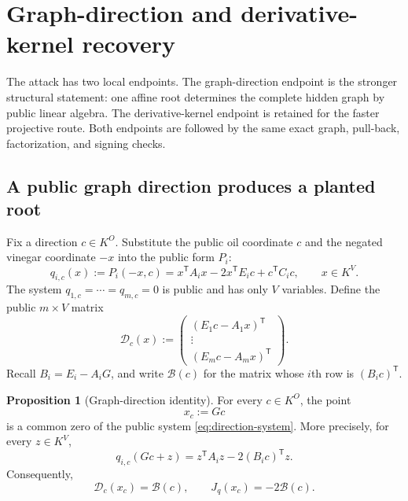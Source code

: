 \documentclass[11pt,a4paper]{article}
\theoremstyle{definition}
\newtheorem{proposition}[theorem]{Proposition}
\theoremstyle{remark}
\begin{document}
\section{Graph-direction and derivative-kernel recovery}\label{sec:recovery}

The attack has two local endpoints.  The graph-direction endpoint is the stronger structural statement: one affine root determines the complete hidden graph by public linear algebra.  The derivative-kernel endpoint is retained for the faster projective route.  Both endpoints are followed by the same exact graph, pull-back, factorization, and signing checks.

\subsection{A public graph direction produces a planted root}

Fix a direction $c\in K^O$.  Substitute the public oil coordinate $c$ and the negated vinegar coordinate $-x$ into the public form $P_i$:
\begin{equation}\label{eq:direction-system}
 q_{i,c}(x):=P_i(-x,c)
 =x^{\mathsf T}A_ix-2x^{\mathsf T}E_ic+c^{\mathsf T}C_ic,
 \qquad x\in K^V.
\end{equation}
The system $q_{1,c}=\cdots=q_{m,c}=0$ is public and has only $V$ variables.  Define the public $m\times V$ matrix
\begin{equation}\label{eq:direction-matrix}
 \mathcal D_c(x):=
 \begin{pmatrix}
 (E_1c-A_1x)^{\mathsf T}\\[-1mm]
 \vdots\\[-1mm]
 (E_mc-A_mx)^{\mathsf T}
 \end{pmatrix}.
\end{equation}
Recall $B_i=E_i-A_iG$, and write $\mathcal B(c)$ for the matrix whose $i$th row is $(B_ic)^{\mathsf T}$.

\begin{proposition}[Graph-direction identity]\label{prop:graph-direction-identity}
For every $c\in K^O$, the point
\[
 x_c:=Gc
\]
is a common zero of the public system \eqref{eq:direction-system}.  More precisely, for every $z\in K^V$,
\begin{equation}\label{eq:direction-translate}
 q_{i,c}(Gc+z)=z^{\mathsf T}A_iz-2(B_ic)^{\mathsf T}z.
\end{equation}
Consequently,
\[
 \mathcal D_c(x_c)=\mathcal B(c),
 \qquad
 J_q(x_c)=-2\mathcal B(c).
\]
\end{proposition}
\end{document}

